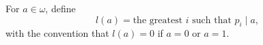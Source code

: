 For $a \in \omega$, define
$$l(a) = \text{the greatest } i \text{ such that } p_i \mid a,$$
with the convention that $l(a) = 0$ if $a = 0$ or $a = 1$.
